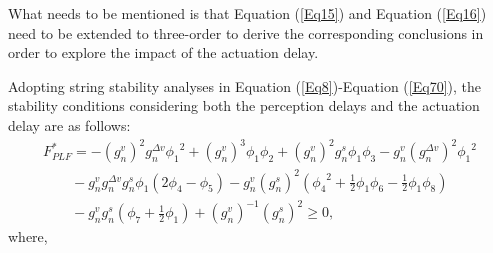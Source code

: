 \documentclass[journal]{IEEEtran}
\begin{document}
What needs to be mentioned is that Equation (\ref{Eq15}) and Equation (\ref{Eq16}) need to be extended to three-order to derive the corresponding conclusions in order to explore the impact of the actuation delay.

Adopting string stability analyses in Equation (\ref{Eq8})-Equation (\ref{Eq70}), the stability conditions considering both the perception delays and the actuation delay are as follows:
\begin{equation}
  \begin{array}{l}
    F_{PLF}^* =  - {\left( {g_n^v} \right)^2}g_n^{\Delta v}{\phi _1}^2 + {\left( {g_n^v} \right)^3}{\phi _1}{\phi _2} + {\left( {g_n^v} \right)^2}g_n^s{\phi _1}{\phi _3} - g_n^v{\left( {g_n^{\Delta v}} \right)^2}{\phi _1}^2 \\
    \quad \quad  - g_n^vg_n^{\Delta v}g_n^s{\phi _1}\left( {2{\phi _4} - {\phi _5}} \right) - g_n^v{\left( {g_n^s} \right)^2}\left( {{\phi _4}^2 + \frac{1}{2}{\phi _1}{\phi _6} - \frac{1}{2}{\phi _1}{\phi _8}} \right)       \\
    \quad \quad  - g_n^vg_n^s\left( {{\phi _7} + \frac{1}{2}{\phi _1}} \right) + {\left( {g_n^v} \right)^{ - 1}}{\left( {g_n^s} \right)^2} \ge 0,
  \end{array}
\end{equation}
where,
\end{document}
